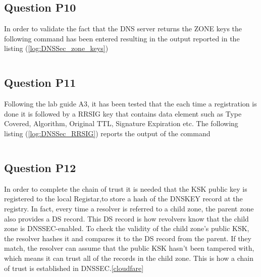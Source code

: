 \inputminted{text}{DNSSec_tree.txt}
\label{log:DNSSec_tree}

\subsection{Question P10}
In order to validate the fact that the DNS server returns the ZONE keys the following command has been entered resulting in the output reported in the listing (\ref{log:DNSSec_zone_keys}) 

\inputminted{text}{DNSSec_zone_keys.txt}
\label{log:DNSSec_zone_keys}

\subsection{Question P11}
Following the lab guide A3, it has been tested that the each time a registration is done it is followed by a RRSIG key that contains data element such as Type Covered, Algorithm, Original TTL, Signature Expiration etc. The following listing (\ref{log:DNSSec_RRSIG}) reports the output of the command 

\inputminted{text}{DNSSec_RRSIG.txt}
\label{log:DNSSec_RRSIG}

\subsection{Question P12}
In order to complete the chain of trust it is needed that the KSK public key is registered to the local Registar,to store a hash of the DNSKEY record at the registry. In fact, every time a resolver is referred to a child zone, the parent zone also provides a DS record. This DS record is how revolvers know that the child zone is DNSSEC-enabled. To check the validity of the child zone’s public KSK, the resolver hashes it and compares it to the DS record from the parent. If they match, the resolver can assume that the public KSK hasn’t been tampered with, which means it can trust all of the records in the child zone. This is how a chain of trust is established in DNSSEC.[\href{https://www.cloudflare.com/dns/dnssec/how-dnssec-works/}{cloudfare}] 


